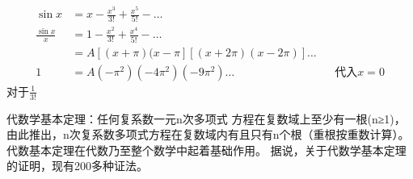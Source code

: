 \begin{thm}
\end{thm}
\begin{thm}[How Euler compute $ \sum_{n=1}^{\infty} \frac{1}{n^2}   $]
\begin{align*}
		\sin x &= x- \frac{x^3}{3!} + \frac{x^5}{5!} -\ldots \\
		\frac{\sin x}{x} &= 1- \frac{x^2}{3!} + \frac{x^4}{5!} -\ldots \\
						 &= A[(x+\pi )(x-\pi ][(x+2\pi )(x-2\pi )]\ldots\\
		1&= A(-\pi ^2)(-4\pi ^2)(-9\pi ^2)\ldots   &&\text{代入} x=0
\end{align*}
对于$ \frac{1}{3!}  $
\end{thm}
\begin{thm}[代数基本定理]
		代数学基本定理：任何复系数一元n次多项式 方程在复数域上至少有一根(n≥1)，由此推出，n次复系数多项式方程在复数域内有且只有n个根（重根按重数计算）。代数基本定理在代数乃至整个数学中起着基础作用。 据说，关于代数学基本定理的证明，现有200多种证法。
\end{thm}

